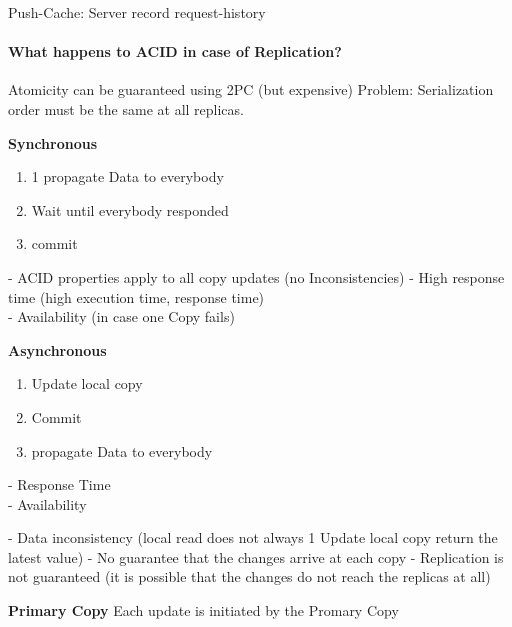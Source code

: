\documentclass[a4paper,12pt]{article}%
\begin{document}
Push-Cache: Server record request-history

\paragraph{What happens to ACID in case of Replication?}
Atomicity can be guaranteed using 2PC (but expensive)
Problem: Serialization order must be the same at all replicas.

{\bf Synchronous} 



\begin{enumerate}
 \item 1 propagate Data  to everybody
 \item Wait until everybody responded 
 \item commit        
\end{enumerate}

 {\color[HTML]{9AB299} 
- ACID properties apply to all copy updates (no Inconsistencies)}    
{\color[HTML]{A38C8C} -  High response time (high execution time, response time)\\
- Availability (in case one Copy fails)}


{\bf Asynchronous}
\begin{enumerate}
\item Update local copy
 \item Commit
 \item propagate Data  to everybody
\end{enumerate}
 {\color[HTML]{9AB299} - Response Time\\ - Availability}    
 
{\color[HTML]{A38C8C} 
 
- Data inconsistency
(local read does not always
1 Update local copy
return the latest value)
- No guarantee that the changes
arrive at each copy
- Replication is not guaranteed (it is possible that the changes do not reach the replicas at all)
}



{\bf Primary Copy}
  Each update is initiated by the Promary Copy
\end{document}
